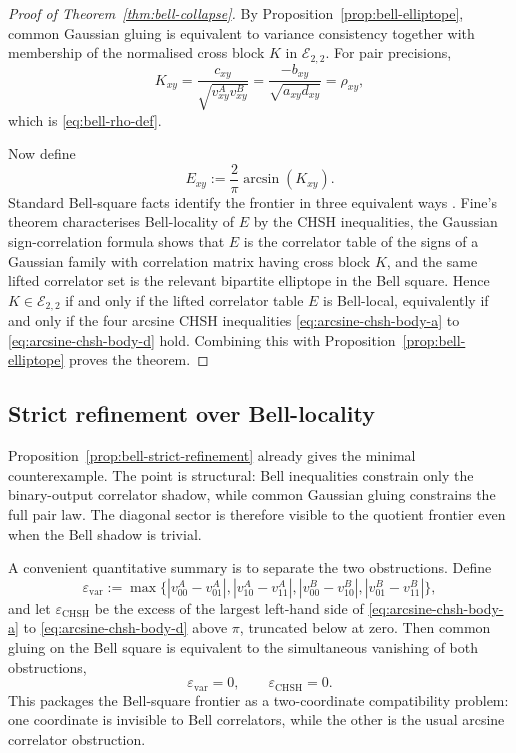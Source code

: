 \documentclass[11pt]{article}
\numberwithin{equation}{section}
\theoremstyle{thmcompact}
\theoremstyle{remark}
\begin{document}
\begin{proof}[Proof of Theorem~\ref{thm:bell-collapse}]
By Proposition~\ref{prop:bell-elliptope}, common Gaussian gluing is equivalent to variance consistency together with membership of the normalised cross block $K$ in $\mathcal E_{2,2}$. For pair precisions,
\[
K_{xy}=\frac{c_{xy}}{\sqrt{v^A_{xy}v^B_{xy}}}=\frac{-b_{xy}}{\sqrt{a_{xy}d_{xy}}}=\rho_{xy},
\]
which is \eqref{eq:bell-rho-def}.

Now define
\[
E_{xy}:=\frac{2}{\pi}\arcsin(K_{xy}).
\]
Standard Bell-square facts identify the frontier in three equivalent ways \cite{Fine1982}. Fine's theorem characterises Bell-locality of $E$ by the CHSH inequalities, the Gaussian sign-correlation formula shows that $E$ is the correlator table of the signs of a Gaussian family with correlation matrix having cross block $K$, and the same lifted correlator set is the relevant bipartite elliptope in the Bell square. Hence $K\in\mathcal E_{2,2}$ if and only if the lifted correlator table $E$ is Bell-local, equivalently if and only if the four arcsine CHSH inequalities \eqref{eq:arcsine-chsh-body-a} to \eqref{eq:arcsine-chsh-body-d} hold. Combining this with Proposition~\ref{prop:bell-elliptope} proves the theorem.
\end{proof}

\subsection{Strict refinement over Bell-locality}

Proposition~\ref{prop:bell-strict-refinement} already gives the minimal counterexample. The point is structural: Bell inequalities constrain only the binary-output correlator shadow, while common Gaussian gluing constrains the full pair law. The diagonal sector is therefore visible to the quotient frontier even when the Bell shadow is trivial.

A convenient quantitative summary is to separate the two obstructions. Define
\begin{equation}\label{eq:epsilon-var-app}
\varepsilon_{\mathrm{var}}:=\max\!\bigl\{|v^A_{00}-v^A_{01}|,|v^A_{10}-v^A_{11}|,|v^B_{00}-v^B_{10}|,|v^B_{01}-v^B_{11}|\bigr\},
\end{equation}
and let $\varepsilon_{\mathrm{CHSH}}$ be the excess of the largest left-hand side of \eqref{eq:arcsine-chsh-body-a} to \eqref{eq:arcsine-chsh-body-d} above $\pi$, truncated below at zero. Then common gluing on the Bell square is equivalent to the simultaneous vanishing of both obstructions,
\[
\varepsilon_{\mathrm{var}}=0,
\qquad
\varepsilon_{\mathrm{CHSH}}=0.
\]
This packages the Bell-square frontier as a two-coordinate compatibility problem: one coordinate is invisible to Bell correlators, while the other is the usual arcsine correlator obstruction.
\end{document}
